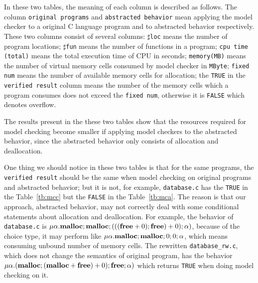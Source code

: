 In these two tables, the meaning of each column is described as
follows. The column \texttt{original programs} and \texttt{abstracted
  behavior} mean applying the model checker to a original C language
program and to abstracted behavior respectively. These two columns
consist of several columns: $\sharp$\texttt{loc} means the number of
program locations; $\sharp$\texttt{fun} means the number of functions
in a program; \texttt{cpu time (total)} means the total execution time
of CPU in seconds; \texttt{memory(MB)} means the number of virtual
memory cells consumed by model checker in \texttt{MByte};
\texttt{fixed num} means the number of available memory cells for
allocation; the \texttt{TRUE} in the \texttt{verified result} column
means the number of the memory cells which a program consumes does not
exceed the \texttt{fixed num}, otherwise it is \texttt{FALSE} which
denotes overflow.

The results present in the these two tables show that the
resources required for model checking become smaller if applying model
checkers to the abstracted behavior, since the abstracted behavior
only consists of allocation and deallocation.

One thing we should notice in these two tables is that for the same
programs, the \texttt{verified result} should be the same when model
checking on original programs and abstracted behavior; but it is not,
for example, \texttt{database.c} has the \texttt{TRUE} in the
Table~\ref{tb:mcc} but the \texttt{FALSE} in the
Table~\ref{tb:mca}. The reason is that our approach, abstracted
behavior, may not correctly deal with some conditional statements
about allocation and deallocation. For example, the behavior of
\texttt{database.c} is $\mu\alpha.\mathbf{malloc};\mathbf{malloc};(((\mathbf{free} + 0);\mathbf{free})
+ 0);\alpha)$, because of the choice type, it may perform like
$\mu\alpha.\mathbf{malloc};\mathbf{malloc};0;0;\alpha$, which means consuming unbound
number of memory cells. The rewritten \texttt{database\_rw.c}, which
does not change the semantics of original program, has the behavior
$\mu\alpha.(\mathbf{malloc};(\mathbf{malloc} + \mathbf{free}) + 0);\mathbf{free};\alpha)$ which
returns \texttt{TRUE} when doing model checking on it.


